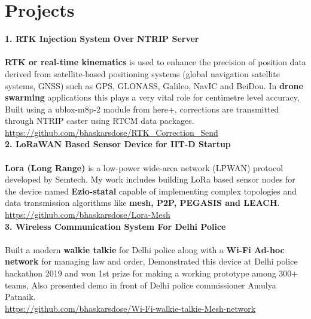 \documentclass[10pt]{report}
\begin{document}
\section*{\color{BlueViolet}\faLaptop\hspace{1pt} Projects}%
\noindent\textbf{\large 1. RTK Injection System Over NTRIP Server\\[1pt]}
\\\textbf{RTK or real-time kinematics} is used to enhance the precision of position data derived from satellite-based positioning systems (global navigation satellite systems, GNSS) such as GPS, GLONASS, Galileo, NavIC and BeiDou. In \textbf{drone swarming} applications this plays a very vital role for centimetre level accuracy, Built using a ublox-m8p-2 module from here+, corrections are transmitted through NTRIP caster using RTCM data packages.
\\\faExternalLink\hspace{1pt} \url{https://github.com/bhaskarsdose/RTK_Correction_Send}
\\[1pt]
 
\noindent\textbf{\large 2. LoRaWAN Based Sensor Device for IIT-D Startup\\[1pt]}
\\\textbf{Lora (Long Range)} is a low-power wide-area network (LPWAN) protocol developed by Semtech. My work includes building LoRa based sensor nodes for the device named \textbf{Ezio-statal} capable of implementing complex topologies and data transmission algorithms like \textbf{mesh, P2P, PEGASIS and LEACH}. 
\\\faExternalLink\hspace{1pt} \url{https://github.com/bhaskarsdose/Lora-Mesh}
\\[1pt]

\noindent\textbf{\large 3. Wireless Communication System For Delhi Police\\[1pt]}
\\Built a modern \textbf{walkie talkie} for Delhi police along with a \textbf{Wi-Fi Ad-hoc network} for managing law and order, Demonstrated this device at Delhi police hackathon 2019 and won 1st prize for making a working prototype among 300+ teams, Also presented demo in front of Delhi police commissioner Amulya Patnaik.
\\\faExternalLink\hspace{1pt} \url{https://github.com/bhaskarsdose/Wi-Fi-walkie-talkie-Mesh-network}
\\[1pt]
\end{document}
